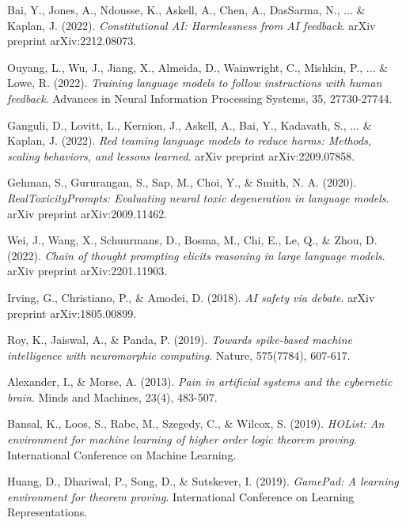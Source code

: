 \documentclass[12pt]{article}
\begin{document}

\begin{thebibliography}{20}

Bai, Y., Jones, A., Ndousse, K., Askell, A., Chen, A., DasSarma, N., ... \& Kaplan, J. (2022).
\textit{Constitutional AI: Harmlessness from AI feedback}.
arXiv preprint arXiv:2212.08073.

Ouyang, L., Wu, J., Jiang, X., Almeida, D., Wainwright, C., Mishkin, P., ... \& Lowe, R. (2022).
\textit{Training language models to follow instructions with human feedback}.
Advances in Neural Information Processing Systems, 35, 27730-27744.

Ganguli, D., Lovitt, L., Kernion, J., Askell, A., Bai, Y., Kadavath, S., ... \& Kaplan, J. (2022).
\textit{Red teaming language models to reduce harms: Methods, scaling behaviors, and lessons learned}.
arXiv preprint arXiv:2209.07858.

Gehman, S., Gururangan, S., Sap, M., Choi, Y., \& Smith, N. A. (2020).
\textit{RealToxicityPrompts: Evaluating neural toxic degeneration in language models}.
arXiv preprint arXiv:2009.11462.

Wei, J., Wang, X., Schuurmans, D., Bosma, M., Chi, E., Le, Q., \& Zhou, D. (2022).
\textit{Chain of thought prompting elicits reasoning in large language models}.
arXiv preprint arXiv:2201.11903.

Irving, G., Christiano, P., \& Amodei, D. (2018).
\textit{AI safety via debate}.
arXiv preprint arXiv:1805.00899.

Roy, K., Jaiswal, A., \& Panda, P. (2019).
\textit{Towards spike-based machine intelligence with neuromorphic computing}.
Nature, 575(7784), 607-617.

Alexander, I., \& Morse, A. (2013).
\textit{Pain in artificial systems and the cybernetic brain}.
Minds and Machines, 23(4), 483-507.

Bansal, K., Loos, S., Rabe, M., Szegedy, C., \& Wilcox, S. (2019).
\textit{HOList: An environment for machine learning of higher order logic theorem proving}.
International Conference on Machine Learning.

Huang, D., Dhariwal, P., Song, D., \& Sutskever, I. (2019).
\textit{GamePad: A learning environment for theorem proving}.
International Conference on Learning Representations.


\end{thebibliography}
\end{document}

